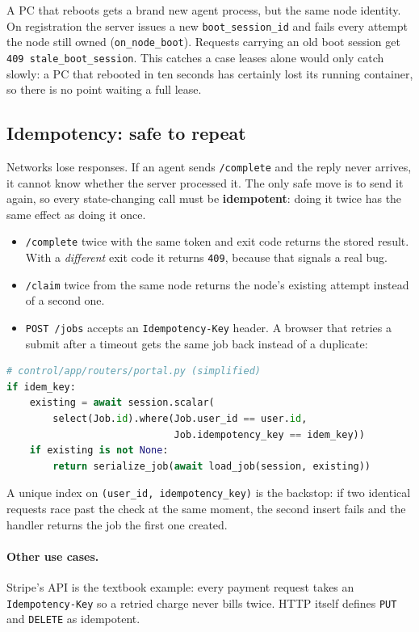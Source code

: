 A PC that reboots gets a brand new agent process, but the same node identity.
On registration the server issues a new \texttt{boot\_session\_id} and fails
every attempt the node still owned (\texttt{on\_node\_boot}). Requests carrying
an old boot session get \texttt{409 stale\_boot\_session}. This catches a case
leases alone would only catch slowly: a PC that rebooted in ten seconds has
certainly lost its running container, so there is no point waiting a full lease.

\subsection{Idempotency: safe to repeat}

Networks lose responses. If an agent sends \texttt{/complete} and the reply
never arrives, it cannot know whether the server processed it. The only safe
move is to send it again, so every state-changing call must be
\textbf{idempotent}: doing it twice has the same effect as doing it once.

\begin{itemize}
\item \texttt{/complete} twice with the same token and exit code returns the
  stored result. With a \emph{different} exit code it returns \texttt{409},
  because that signals a real bug.
\item \texttt{/claim} twice from the same node returns the node's existing
  attempt instead of a second one.
\item \texttt{POST /jobs} accepts an \texttt{Idempotency-Key} header. A browser
  that retries a submit after a timeout gets the same job back instead of a
  duplicate:
\end{itemize}

\begin{lstlisting}[language=Python]
# control/app/routers/portal.py (simplified)
if idem_key:
    existing = await session.scalar(
        select(Job.id).where(Job.user_id == user.id,
                             Job.idempotency_key == idem_key))
    if existing is not None:
        return serialize_job(await load_job(session, existing))
\end{lstlisting}

A unique index on \texttt{(user\_id, idempotency\_key)} is the backstop: if two
identical requests race past the check at the same moment, the second insert
fails and the handler returns the job the first one created.

\paragraph{Other use cases.} Stripe's API is the textbook example: every
payment request takes an \texttt{Idempotency-Key} so a retried charge never
bills twice. HTTP itself defines \texttt{PUT} and \texttt{DELETE} as idempotent.

